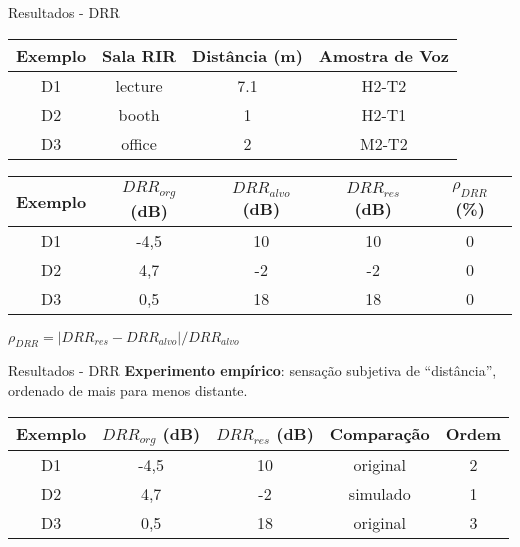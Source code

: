 \begin{frame}{Resultados - DRR}
    \begin{table} [H]
        \centering
        \label{tbl:da-drr}
        \begin{tabular}{c|c|c|c}
    
            \textbf{Exemplo} & 
            \textbf{Sala RIR} & 
            \textbf{Distância (m)} &
            \textbf{Amostra de Voz} \\
            \hline 
    
            D1 & lecture & 7.1 & H2-T2 \\
            D2 & booth & 1 & H2-T1 \\
            D3 & office & 2 & M2-T2 \\
    
        \end{tabular}
        \bigbreak
        \bigbreak
        \begin{tabular}{c|c|c|c|c}
    
            \textbf{Exemplo} & 
            \textbf{$DRR_{org}$ (dB)} & 
            \textbf{$DRR_{alvo}$ (dB)} &
            \textbf{$DRR_{res}$ (dB)} & 
            \textbf{$\rho_{DRR}$ (\%)} \\
            \hline 
    
            D1 & -4,5 & 10 & 10 & 0 \\
            D2 & 4,7 & -2 & -2 & 0 \\
            D3 & 0,5 & 18 & 18 & 0 \\
    
        \end{tabular}
        \vspace{0.5cm}

        $\rho_{DRR} = |DRR_{res} - DRR_{alvo}|/DRR_{alvo}$
    \end{table}
\end{frame}

\begin{frame}{Resultados - DRR}
    \textbf{Experimento empírico}: sensação subjetiva de “distância”, ordenado de mais para menos distante.
    \vspace{1cm}
    
    \begin{table} [H]
        \centering
        \begin{tabular}{c|c|c|c|c}
    
            \textbf{Exemplo} & 
            \textbf{$DRR_{org}$ (dB)} & 
            \textbf{$DRR_{res}$ (dB)} & 
            \textbf{Comparação} &
            \textbf{Ordem} \\
            \hline 
    
            D1 & -4,5 & 10 & original & 2 \\
            D2 & 4,7 & -2 & simulado & 1 \\
            D3 & 0,5 & 18 & original & 3 \\
    
        \end{tabular}
    \end{table}
\end{frame}

